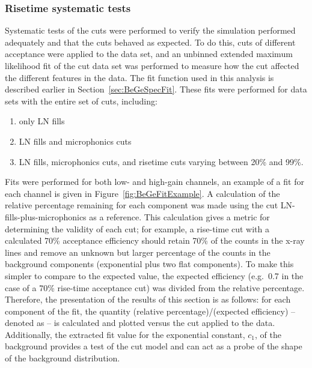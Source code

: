 		\subsubsection{Risetime systematic tests}
		\label{sec:RisetimeSystematicTests}	
	
	Systematic tests of the cuts were performed to verify the simulation performed adequately and that the cuts behaved as expected.  To do this, cuts of different acceptance were applied to the data set, and an unbinned extended maximum likelihood fit of the cut data set was performed to measure how the cut affected the different features in the data.  The fit function used in this analysis is described earlier in Section~\ref{sec:BeGeSpecFit}.  These fits were performed for data sets with the entire set of cuts, including:

					\begin{enumerate}
						\item only LN fills
						\item LN fills and microphonics cuts
						\item LN fills, microphonics cuts, and risetime cuts varying between 20\% and 99\%.
					\end{enumerate}

Fits were performed for both low- and high-gain channels, an example of a fit for each channel is given in Figure~\ref{fig:BeGeFitExample}.  A calculation of the relative percentage remaining for each component was made using the cut LN-fills-plus-microphonics as a reference.  This calculation gives a metric for determining the validity of each cut; for example, a rise-time cut with a calculated 70\% acceptance efficiency should retain 70\% of the counts in the x-ray lines and remove an unknown but larger percentage of the counts in the background components (exponential plus two flat components).  To make this simpler to compare to the expected value, the expected efficiency (e.g.~0.7 in the case of a 70\% rise-time acceptance cut) was divided from the relative percentage.  Therefore, the presentation of the results of this section is as follows: for each component of the fit, the quantity (relative percentage)/(expected efficiency) -- denoted as \releff-- is calculated and plotted versus the cut applied to the data.  Additionally, the extracted fit value for the exponential constant, $c_{1}$, of the background provides a test of the cut model and can act as a probe of the shape of the background distribution.  
	
